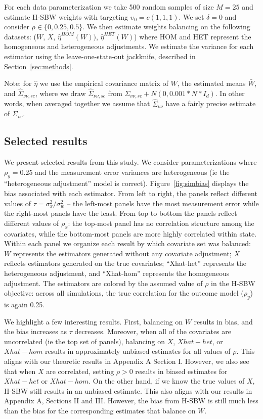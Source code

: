 For each data parameterization we take 500 random samples of size $M = 25$ and estimate H-SBW weights with targeting $\upsilon_0 = c(1, 1, 1)$. We set $\delta = 0$ and consider $\rho \in \{0, 0.25, 0.5\}$. We then estimate weights balancing on the following datasets: ($W$, $X$, $\hat{\eta}^{HOM}(W))$, $\hat{\eta}^{HET}(W)$) where HOM and HET represent the homogeneous and heterogeneous adjustments. We estimate the variance for each estimator using the leave-one-state-out jackknife, described in Section~\ref{sec:methods}. 
 
Note: for $\hat{\eta}$ we use the empirical covariance matrix of $W$, the estimated means $\bar{W}$, and $\hat{\Sigma}_{\nu\nu, sc}$, where we draw $\hat{\Sigma}_{\nu\nu, sc}$ from $\Sigma_{\nu\nu, sc} + N(0, 0.001*N*I_d)$. In other words, when averaged together we assume that $\hat{\Sigma}_{\nu\nu}$ have a fairly precise estimate of $\Sigma_{vv}$.

\subsection{Selected results}

We present selected results from this study. We consider parameterizations where $\rho_y = 0.25$ and the measurement error variances are heterogeneous (ie the ``heterogeneous adjustment'' model is correct). Figure~\ref{fig:simbias} displays the bias associated with each estimator. From left to right, the panels reflect different values of $\tau = \sigma^2_x/\sigma^2_w$ -- the left-most panels have the most measurement error while the right-most panels have the least. From top to bottom the panels reflect different values of $\rho_x$: the top-most panel has no correlation structure among the covariates, while the bottom-most panels are more highly correlated within state. Within each panel we organize each result by which covariate set was balanced: $W$ represents the estimators generated without any covariate adjustment; $X$ reflects estimators generated on the true covariates; ``Xhat-het'' represents the heterogeneous adjustment, and ``Xhat-hom'' represents the homogeneous adjustment. The estimators are colored by the assumed value of $\rho$ in the H-SBW objective: across all simulations, the true correlation for the outcome model ($\rho_y$) is again 0.25.

We highlight a few interesting results. First, balancing on $W$ results in bias, and the bias increases as $\tau$ decreases. Moreover, when all of the covariates are uncorrelated (ie the top set of panels), balancing on $X$, $Xhat-het$, or $Xhat-hom$ results in approximately unbiased estimates for all values of $\rho$. This aligns with our theoretic results in Appendix A Section I. However, we also see that when $X$ are correlated, setting $\rho > 0$ results in biased estimates for $Xhat-het$ or $Xhat-hom$. On the other hand, if we know the true values of $X$, H-SBW still results in an unbiased estimate. This also aligns with our results in Appendix A, Sections II and III. However, the bias from H-SBW is still much less than the bias for the corresponding estimates that balance on $W$. 

